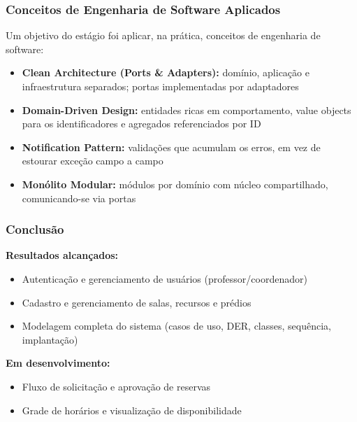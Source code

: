 \documentclass[11pt, xcolor={dvipsnames}, usepdftitle=false]{beamer}
\begin{document}
\begin{frame}
\frametitle{Conceitos de Engenharia de Software Aplicados}
Um objetivo do estágio foi aplicar, na prática, conceitos de engenharia de software:
\begin{itemize}
\item \textbf{Clean Architecture (Ports \& Adapters):} domínio, aplicação e infraestrutura separados; portas implementadas por adaptadores
\item \textbf{Domain-Driven Design:} entidades ricas em comportamento, value objects para os identificadores e agregados referenciados por ID
\item \textbf{Notification Pattern:} validações que acumulam os erros, em vez de estourar exceção campo a campo
\item \textbf{Monólito Modular:} módulos por domínio com núcleo compartilhado, comunicando-se via portas
\end{itemize}
\end{frame}

\begin{frame}
\frametitle{Conclusão}
\textbf{Resultados alcançados:}
\begin{itemize}
\item Autenticação e gerenciamento de usuários (professor/coordenador)
\item Cadastro e gerenciamento de salas, recursos e prédios
\item Modelagem completa do sistema (casos de uso, DER, classes, sequência, implantação)
\end{itemize}
\vspace{3mm}
\textbf{Em desenvolvimento:}
\begin{itemize}
\item Fluxo de solicitação e aprovação de reservas
\item Grade de horários e visualização de disponibilidade
\end{itemize}
\end{frame}


\begin{frame}
\end{frame}
\end{document}
